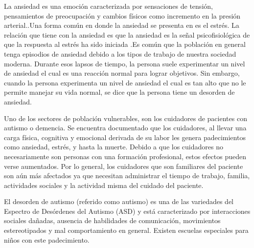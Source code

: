 \documentclass[letterpaper,12pt]{cicese}
\begin{document}
			
			La ansiedad es una emoci\'on caracterizada por sensaciones de tensi\'on, pensamientos de preocupaci\'on y cambios f\'isicos como incremento en la presi\'on arterial.\citep{psychologyapa}.Una forma com\'un en donde la ansiedad se presenta en es el estr\'es. La relaci\'on que tiene con la ansiedad es que la ansiedad es la se\~nal psicofisiol\'ogica de que la respuesta al estr\'es ha sido iniciada \citep{PMID2235645}.Es com\'un que la poblaci\'on en general tenga episodios de ansiedad debido a los tipos de trabajo de nuestra sociedad moderna. Durante esos lapsos de tiempo, la persona suele experimentar un nivel de ansiedad el cual es una reacci\'on normal para lograr objetivos. Sin embargo, cuando la persona experimenta un nivel de ansiedad el cual es tan alto que no le permite manejar su vida normal, se dice que la persona tiene un desorden de ansiedad\citep{repetto2013}.

			Uno de los sectores de poblaci\'on vulnerables, son los cuidadores de pacientes con autismo o demencia. Se encuentra documentado que los cuidadores, al llevar una carga f\'isica, cognitiva y emocional derivada de su labor les genera padecimientos como ansiedad, estr\'es, y hasta la muerte\citep{Chen2013}. Debido a que los cuidadores no necesariamente son personas con una formaci\'on profesional, estos efectos pueden verse aumentados. Por lo general, los cuidadores que son familiares del paciente son a\'un m\'as afectados ya que necesitan administrar el tiempo de trabajo, familia, actividades sociales y la actividad misma del cuidado del paciente.

			El desorden de autismo (referido como autismo) es una de las variedades del Espectro de Des\'ordenes del Autismo (ASD) y est\'a caracterizado por interacciones sociales da\~nadas, ausencia de habilidades de comunicaci\'on, movimientos estereotipados y mal comportamiento en general\citep{bernier2010autism}. Existen escuelas especiales para ni\~nos con este padecimiento. 
\end{document}
